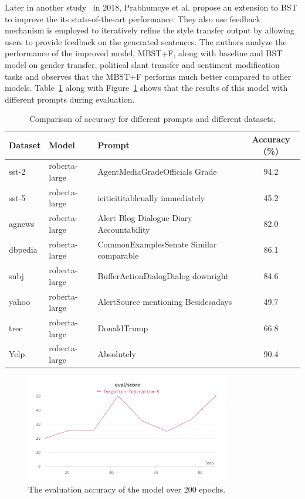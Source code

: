 \documentclass[akbc,twoside,11pt]{article}
\begin{document}
Later in another study~\cite{prabhumoye2018style2} in 2018, Prabhumoye et al. propose an extension to BST to improve the its state-of-the-art performance. They also use feedback mechanism is employed to iteratively refine the style transfer output by allowing users to provide feedback on the generated sentences. The authors analyze the performance of the improved model, MBST+F, along with baseline and BST model on gender transfer, political slant transfer and sentiment modification tasks and observes that the MBST+F performs much better compared to other models. Table~\ref{tab:2018} along with Figure~\ref{fig:eval2018} shows that the results of this model with different prompts during evaluation. 

\begin{table}[h]
\begin{tabular}{|l|l|l|c|}
\hline
\textbf{Dataset} & \textbf{Model} & \textbf{Prompt} & \textbf{Accuracy (\%)} \\ \hline
sst-2 & roberta-large & AgentMediaGradeOfficials Grade & 94.2 \\ \hline
sst-5 & roberta-large & iciticititableually immediately & 45.2 \\ \hline
agnews & roberta-large & Alert Blog Dialogue Diary Accountability & 82.0 \\ \hline
dbpedia & roberta-large & CommonExamplesSenate Similar comparable & 86.1 \\ \hline
subj & roberta-large & BufferActionDialogDialog downright & 84.6 \\ \hline
yahoo & roberta-large & AlertSource mentioning Besidesadays & 49.7 \\ \hline
trec & roberta-large & DonaldTrump & 66.8 \\ \hline
{Yelp\footnotemark} & roberta-large & Absolutely & 90.4 \\ \hline
\end{tabular}
\caption{\label{tab:2018} Comparison of accuracy for different prompts and different datasets.}
\end{table}

\begin{figure}[h]
    \centering
    \includegraphics[width=0.8\textwidth]{assets/eval_score_2018}
    \caption{The evaluation accuracy of the model over 200 epochs.}
    \label{fig:eval2018}
\end{figure}
\end{document}
